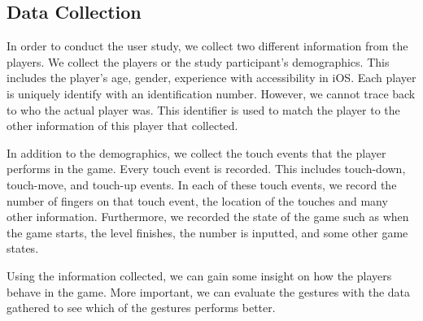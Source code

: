 \subsection{Data Collection}
In order to conduct the user study, we collect two different information from the players. We collect the players or the study participant's demographics. This includes the player's age, gender, experience with accessibility in iOS. Each player is uniquely identify with an identification number. However, we cannot trace back to who the actual player was. This identifier is used to match the player to the other information of this player that collected.
\par
In addition to the demographics, we collect the touch events that the player performs in the game. Every touch event is recorded. This includes touch-down, touch-move, and touch-up events. In each of these touch events, we record the number of fingers on that touch event, the location of the touches and many other information. Furthermore, we recorded the state of the game such as when the game starts, the level finishes, the number is inputted, and some other game states.
\par
Using the information collected, we can gain some insight on how the players behave in the game. More important, we can evaluate the gestures with the data gathered to see which of the gestures performs better.